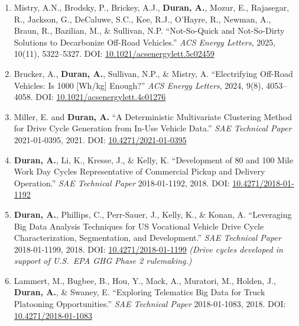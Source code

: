 \documentclass[11pt,letterpaper]{article}
\begin{document}
\begin{enumerate}
  \item Mistry, A.N., Brodsky, P., Brickey, A.J., \textbf{Duran, A.}, Mozur, E.,
        Rajasegar, R., Jackson, G., DeCaluwe, S.C., Kee, R.J., O'Hayre, R., Newman, A.,
        Braun, R., Bazilian, M., \& Sullivan, N.P.
        ``Not-So-Quick and Not-So-Dirty Solutions to Decarbonize Off-Road Vehicles.''
        \textit{ACS Energy Letters}, 2025, 10(11), 5322--5327.
        DOI: \href{https://doi.org/10.1021/acsenergylett.5c02459}{10.1021/acsenergylett.5c02459}

  \item Brucker, A., \textbf{Duran, A.}, Sullivan, N.P., \& Mistry, A.
        ``Electrifying Off-Road Vehicles: Is 1000 [Wh/kg] Enough?''
        \textit{ACS Energy Letters}, 2024, 9(8), 4053--4058.
        DOI: \href{https://doi.org/10.1021/acsenergylett.4c01276}{10.1021/acsenergylett.4c01276}

  \item Miller, E. and \textbf{Duran, A.}
        ``A Deterministic Multivariate Clustering Method for Drive Cycle Generation from
        In-Use Vehicle Data.''
        \textit{SAE Technical Paper} 2021-01-0395, 2021.
        DOI: \href{https://doi.org/10.4271/2021-01-0395}{10.4271/2021-01-0395}

  \item \textbf{Duran, A.}, Li, K., Kresse, J., \& Kelly, K.
        ``Development of 80 and 100 Mile Work Day Cycles Representative of Commercial
        Pickup and Delivery Operation.''
        \textit{SAE Technical Paper} 2018-01-1192, 2018.
        DOI: \href{https://doi.org/10.4271/2018-01-1192}{10.4271/2018-01-1192}

  \item \textbf{Duran, A.}, Phillips, C., Perr-Sauer, J., Kelly, K., \& Konan, A.
        ``Leveraging Big Data Analysis Techniques for US Vocational Vehicle Drive Cycle
        Characterization, Segmentation, and Development.''
        \textit{SAE Technical Paper} 2018-01-1199, 2018.
        DOI: \href{https://doi.org/10.4271/2018-01-1199}{10.4271/2018-01-1199}
        \textit{(Drive cycles developed in support of U.S.\ EPA GHG Phase 2 rulemaking.)}

  \item Lammert, M., Bugbee, B., Hou, Y., Mack, A., Muratori, M., Holden, J.,
        \textbf{Duran, A.}, \& Swaney, E.
        ``Exploring Telematics Big Data for Truck Platooning Opportunities.''
        \textit{SAE Technical Paper} 2018-01-1083, 2018.
        DOI: \href{https://doi.org/10.4271/2018-01-1083}{10.4271/2018-01-1083}


\end{enumerate}
\end{document}

